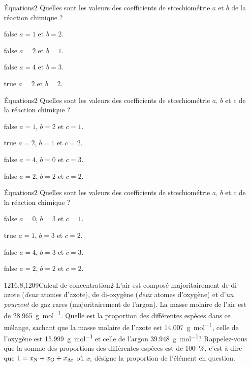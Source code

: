 		\begin{question}{8}{Équations}{2}{}
            Quelles sont les valeurs des coefficients de st\oe{}chiométrie $a$ et $b$ de la réaction chimique ?
        \end{question}
        \begin{reponses}
            \item[false] $a=1$ et $b=2$.
            \item[false] $a=2$ et $b=1$.
            \item[false] $a=4$ et $b=3$.
            \item[true] $a=2$ et $b=2$.
        \end{reponses}
        \begin{question}{8}{Équations}{2}{}
            Quelles sont les valeurs des coefficients de st\oe{}chiométrie $a$, $b$ et $c$ de la réaction chimique ?
        \end{question}
        \begin{reponses}
            \item[false] $a=1$, $b=2$ et $c=1$.
            \item[true] $a=2$, $b=1$ et $c=2$.
            \item[false] $a=4$, $b=0$ et $c=3$.
            \item[false] $a=2$, $b=2$ et $c=2$.
        \end{reponses}
		\begin{question}{8}{Équations}{2}{}
			Quelles sont les valeurs des coefficients de st\oe{}chiométrie $a$, $b$ et $c$ de la réaction chimique ?
		\end{question}
		\begin{reponses}
			\item[false] $a=0$, $b=3$ et $c=1$.
			\item[true] $a=1$, $b=3$ et $c=2$.
			\item[false] $a=4$, $b=3$ et $c=3$.
			\item[false] $a=2$, $b=2$ et $c=2$.
		\end{reponses}
		\begin{question}{1216,8,1209}{Calcul de concentration}{2}{}
            L'air est composé majoritairement de di-azote (\emph{deux} atomes d'azote), de di-oxygène (\emph{deux} atomes d'oxygène) et d'\emph{un pourcent} de gaz rares (majoritairement de l'argon). La masse molaire de l'air est de \SI{28.965}{\gram\per\mol}. Quelle est la proportion des différentes espèces dans ce mélange, sachant que la masse molaire de l'azote est \SI{14.007}{\gram\per\mol}, celle de l'oxygène est \SI{15.999}{\gram\per\mol} et celle de l'argon \SI{39.948}{\gram\per\mol}? Rappelez-vous que la somme des proportions des différentes espèces est de \SI{100}{\percent}, c'est à dire que $1 = x_{\ce{N}} + x_{\ce{O}} + x_{\ce{Ar}}$ où $x_i$ désigne la proportion de l'élément en question.
        \end{question}
